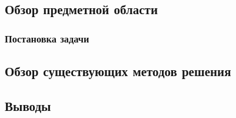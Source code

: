 \documentclass[../document.tex]{subfiles}
\begin{document}
	\subsection{Обзор предметной области}
	\subsubsection{Постановка задачи}
	\subsection{Обзор существующих методов решения}
	\subsection{Выводы}
\end{document}
